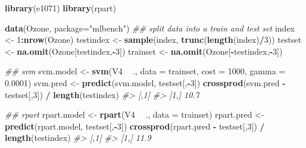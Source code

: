 \documentclass[]{book}
\newenvironment{Shaded}{\begin{snugshade}}{\end{snugshade}}
\newcommand{\CommentTok}[1]{\textcolor[rgb]{0.56,0.35,0.01}{\textit{#1}}}
\newcommand{\DataTypeTok}[1]{\textcolor[rgb]{0.13,0.29,0.53}{#1}}
\newcommand{\DecValTok}[1]{\textcolor[rgb]{0.00,0.00,0.81}{#1}}
\newcommand{\FloatTok}[1]{\textcolor[rgb]{0.00,0.00,0.81}{#1}}
\newcommand{\KeywordTok}[1]{\textcolor[rgb]{0.13,0.29,0.53}{\textbf{#1}}}
\newcommand{\NormalTok}[1]{#1}
\newcommand{\OperatorTok}[1]{\textcolor[rgb]{0.81,0.36,0.00}{\textbf{#1}}}
\newcommand{\StringTok}[1]{\textcolor[rgb]{0.31,0.60,0.02}{#1}}
\begin{document}
\begin{Shaded}
\begin{Highlighting}[]
\KeywordTok{library}\NormalTok{(e1071)}
\KeywordTok{library}\NormalTok{(rpart)}

\KeywordTok{data}\NormalTok{(Ozone, }\DataTypeTok{package=}\StringTok{"mlbench"}\NormalTok{)}
\CommentTok{## split data into a train and test set}
\NormalTok{index <-}\StringTok{ }\DecValTok{1}\OperatorTok{:}\KeywordTok{nrow}\NormalTok{(Ozone)}
\NormalTok{testindex <-}\StringTok{ }\KeywordTok{sample}\NormalTok{(index, }\KeywordTok{trunc}\NormalTok{(}\KeywordTok{length}\NormalTok{(index)}\OperatorTok{/}\DecValTok{3}\NormalTok{))}
\NormalTok{testset <-}\StringTok{ }\KeywordTok{na.omit}\NormalTok{(Ozone[testindex,}\OperatorTok{-}\DecValTok{3}\NormalTok{])}
\NormalTok{trainset <-}\StringTok{ }\KeywordTok{na.omit}\NormalTok{(Ozone[}\OperatorTok{-}\NormalTok{testindex,}\OperatorTok{-}\DecValTok{3}\NormalTok{])}
\end{Highlighting}
\end{Shaded}

\begin{Shaded}
\begin{Highlighting}[]
\CommentTok{## svm}
\NormalTok{svm.model <-}\StringTok{ }\KeywordTok{svm}\NormalTok{(V4 }\OperatorTok{~}\StringTok{ }\NormalTok{., }\DataTypeTok{data =}\NormalTok{ trainset, }\DataTypeTok{cost =} \DecValTok{1000}\NormalTok{, }\DataTypeTok{gamma =} \FloatTok{0.0001}\NormalTok{)}
\NormalTok{svm.pred  <-}\StringTok{ }\KeywordTok{predict}\NormalTok{(svm.model, testset[,}\OperatorTok{-}\DecValTok{3}\NormalTok{])}
\KeywordTok{crossprod}\NormalTok{(svm.pred }\OperatorTok{-}\StringTok{ }\NormalTok{testset[,}\DecValTok{3}\NormalTok{]) }\OperatorTok{/}\StringTok{ }\KeywordTok{length}\NormalTok{(testindex)}
\CommentTok{#>      [,1]}
\CommentTok{#> [1,] 10.7}
\end{Highlighting}
\end{Shaded}

\begin{Shaded}
\begin{Highlighting}[]
\CommentTok{## rpart}
\NormalTok{rpart.model <-}\StringTok{ }\KeywordTok{rpart}\NormalTok{(V4 }\OperatorTok{~}\StringTok{ }\NormalTok{., }\DataTypeTok{data =}\NormalTok{ trainset)}
\NormalTok{rpart.pred  <-}\StringTok{ }\KeywordTok{predict}\NormalTok{(rpart.model, testset[,}\OperatorTok{-}\DecValTok{3}\NormalTok{])}
\KeywordTok{crossprod}\NormalTok{(rpart.pred }\OperatorTok{-}\StringTok{ }\NormalTok{testset[,}\DecValTok{3}\NormalTok{]) }\OperatorTok{/}\StringTok{ }\KeywordTok{length}\NormalTok{(testindex)}
\CommentTok{#>      [,1]}
\CommentTok{#> [1,] 11.9}
\end{Highlighting}
\end{Shaded}
\end{document}
